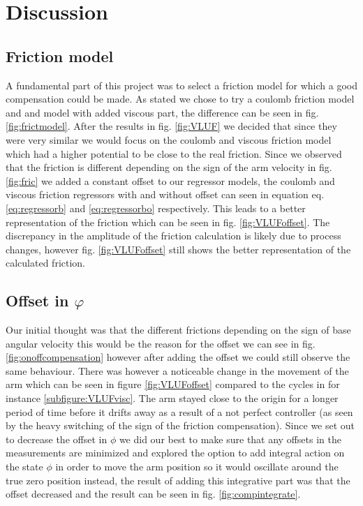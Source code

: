 \documentclass[10pt,a4paper]{article}
\begin{document}
\section{Discussion}



\subsection{Friction model}
A fundamental part of this project was to select a friction model for which a good compensation could be made. As stated we chose to try a coulomb friction model and and model with added viscous part, the difference can be seen in fig. \ref{fig:frictmodel}. After the results in fig. \ref{fig:VLUF} we decided that since they were very similar we would focus on the coulomb and viscous friction model which had a higher potential to be close to the real friction.
Since we observed that the friction is different depending on the sign of the arm velocity in fig. \ref{fig:fric} we added a constant offset to our regressor models, the coulomb and viscous friction regressors with and without offset can seen in equation eq. \ref{eq:regressorb} and \ref{eq:regressorbo} respectively. This leads to a better representation of the friction which can be seen in fig. \ref{fig:VLUFoffset}. The discrepancy in the amplitude of the friction calculation is likely due to process changes, however fig. \ref{fig:VLUFoffset} still shows the better representation of the calculated friction.


\subsection{Offset in $ \varphi $}
Our initial thought was that the different frictions depending on the sign of base angular velocity this would be the reason for the offset we can see in fig. \ref{fig:onoffcompensation} however after adding the offset we could still observe the same behaviour. There was however a noticeable change in the movement of the arm which can be seen in figure \ref{fig:VLUFoffset} compared to the cycles in for instance \ref{subfigure:VLUFvisc}. The arm stayed close to the origin for a longer period of time before it drifts away as a result of a not perfect controller (as seen by the heavy switching of the sign of the friction compensation).
Since we set out to decrease the offset in $ \phi $ we did our best to make sure that any offsets in the measurements are minimized and explored the option to add integral action on the state $ \phi $ in order to move the arm position so it would oscillate around the true zero position instead, the result of adding this integrative part was that the offset decreased and the result can be seen in fig. \ref{fig:compintegrate}.
\end{document}

